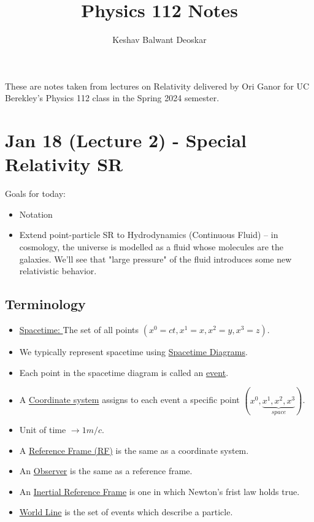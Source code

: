 \documentclass{article}
\title{Physics 112 Notes}
\author{Keshav Balwant Deoskar}
\begin{document}
\maketitle

These are notes taken from lectures on Relativity delivered by Ori Ganor for UC Berekley's Physics 112 class in the Spring 2024 semester.

\tableofcontents

\pagebreak


\vskip 0.5cm
\section{Jan 18 (Lecture 2) - Special Relativity SR}

Goals for today:
\begin{itemize}
  \item Notation
  \item Extend point-particle SR to Hydrodynamics (Continuous Fluid) -- in cosmology, the universe is modelled as a fluid whose molecules are the galaxies. We'll see that "large pressure" of the fluid introduces some new relativistic behavior.
\end{itemize}

\vskip 1cm
\subsection{Terminology}
\begin{itemize}
  \item \underline{Spacetime: } The set of all points $(x^0 = ct, x^1 = x, x^2 = y, x^3 = z)$.
  \item We typically represent spacetime using \underline{Spacetime Diagrams}. 
  \item Each point in the spacetime diagram is called an \underline{event}.
  
  \item A \underline{Coordinate system} assigns to each event a specific point $(x^0, \underbrace{x^1, x^2, x^3}_{space})$.
  \item Unit of time $\rightarrow 1 m/c$.
  
  \item A \underline{Reference Frame (RF)} is the same as a coordinate system.
  \item An \underline{Observer} is the same as a reference frame.
  
  \item An \underline{Inertial Reference Frame} is one in which Newton's frist law holds true.
  \item \underline{World Line} is the set of events which describe a particle.
\end{itemize}
\end{document}
